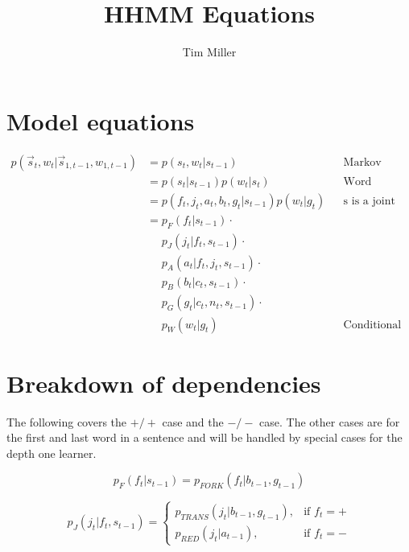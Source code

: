\documentclass[12pt]{article}
\title{HHMM Equations}
\author {Tim Miller}
\begin{document}
\section{Model equations}
\begin{align*}
p(\vec{s}_t,w_t | \vec{s}_{1,t-1},w_{1,t-1}) &= p(s_t,w_t | s_{t-1}) && \text{Markov Assumption} \\
                                     &= p(s_t|s_{t-1}) p(w_t | s_t) && \text{Word depends only on current state}\\
                                     &= p(f_t,j_t,a_t,b_t,g_t | s_{t-1}) p(w_t | g_t) && \text{s is a joint of multiple sub-variables} \\
                                     &= p_{F}(f_t|s_{t-1}) \cdot \\
                                     &\phantom{{}= } p_{J}(j_t | f_t,s_{t-1}) \cdot\\
                                     &\phantom{{}= } p_{A}(a_t|f_t,j_t,s_{t-1}) \cdot\\
                                     &\phantom{{}= } p_{B}(b_t|c_t,s_{t-1}) \cdot\\
                                     &\phantom{{}= } p_{G}(g_t|c_t,n_t,s_{t-1}) \cdot\\
                                     &\phantom{{}= } p_{W}(w_t|g_t) && \text{Conditional dependencies} 
\end{align*}
                                    

\section{Breakdown of dependencies}
The following covers the $+/+$ case and the $-/-$ case. The other cases are for the first and last word in a sentence and will be handled by special cases for the depth one learner.

\begin{equation}
p_{F}(f_t|s_{t-1}) = p_{FORK}(f_t|b_{t-1},g_{t-1})
\end{equation}

\begin{equation}
p_{J}(j_t|f_t,s_{t-1}) = 
	\begin{cases}
      p_{TRANS}(j_t|b_{t-1},g_{t-1}), & \text{if } f_{t}=+ \\
      p_{RED}(j_t|a_{t-1}), & \text{if } f_{t}=- 
    \end{cases}
\end{equation}
\end{document}

